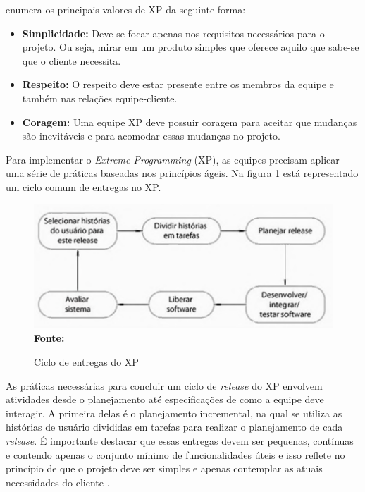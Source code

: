 \documentclass[
    12pt,       %
    openright,      %
    twoside,      %
    a4paper,      %
    english,      %
    french,       %
    spanish,      %
    brazil,       %
    ]{abntex2}
\begin{document}
 enumera os principais valores de XP da seguinte forma:

\begin{itemize}
    \item \textbf{Simplicidade:} Deve-se focar apenas nos requisitos necessários para o projeto. Ou seja, mirar em um produto simples que oferece aquilo que sabe-se que o cliente necessita.
    \item \textbf{Respeito:} O respeito deve estar presente entre os membros da equipe e também nas relações equipe-cliente. 
    \item \textbf{Coragem:} Uma equipe XP deve possuir coragem para aceitar que mudanças são inevitáveis e para acomodar essas mudanças no projeto.
\end{itemize}

Para implementar o \textit{Extreme Programming} (XP), as equipes precisam aplicar uma série de práticas baseadas nos princípios ágeis. Na figura \ref{cicloRelease} está representado um ciclo comum de entregas no XP.

\begin{figure}[h]
    \centering
    \caption{Ciclo de entregas do XP}
    \includegraphics[scale=0.4]{src/tex/img/cicloReleaseXPSommerVille.png}\\
    \label{cicloRelease}
    \textbf{Fonte:} 
\end{figure}

As práticas necessárias para concluir um ciclo de \textit{release} do XP envolvem atividades desde o planejamento até especificações de como a equipe deve interagir. A primeira delas é o planejamento incremental, na qual se utiliza as histórias de usuário divididas em tarefas para realizar o planejamento de cada \textit{release}. É importante destacar que essas entregas devem ser pequenas, contínuas e contendo apenas o conjunto mínimo de funcionalidades úteis e isso reflete no princípio de que o projeto deve ser simples e apenas contemplar as atuais necessidades do cliente \cite{SOMMERVILLE:2011}.
\end{document}
